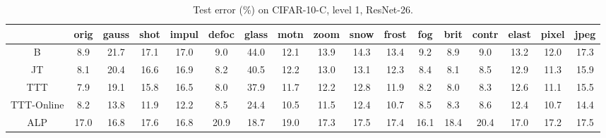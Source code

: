 \begin{table}[ht]
	\footnotesize
	\begin{center}
		{
			\setlength\tabcolsep{3.5pt}
			\begin{tabular}{c|c|c|c|c|c|c|c|c|c|c|c|c|c|c|c|c}
				\hline
				& orig& gauss& shot& impul& defoc& glass& motn& zoom& snow& frost& fog& brit& contr& elast& pixel& jpeg\\
				\hline
				B & 8.9& 21.7& 17.1& 17.0& 9.0& 44.0& 12.1& 13.9& 14.3& 13.4& 9.2& 8.9& 9.0& 13.2& 12.0& 17.3\\
				\hline
				JT & 8.1& 20.4& 16.6& 16.9& 8.2& 40.5& 12.2& 13.0& 13.1& 12.3& 8.4& 8.1& 8.5& 12.9& 11.3& 15.9\\
				\hline
				TTT & 7.9& 19.1& 15.8& 16.5& 8.0& 37.9& 11.7& 12.2& 12.8& 11.9& 8.2& 8.0& 8.3& 12.6& 11.1& 15.5\\
				\hline
				TTT-Online & 8.2& 13.8& 11.9& 12.2& 8.5& 24.4& 10.5& 11.5& 12.4& 10.7& 8.5& 8.3& 8.6& 12.4& 10.7& 14.4\\
				\hline
				ALP & 17.0& 16.8& 17.6& 16.8& 20.9& 18.7& 19.0& 17.3& 17.5& 17.4& 16.1& 18.4& 20.4& 17.0& 17.2 & 17.5\\
				\hline
			\end{tabular}
		}
	\end{center}
	\vspace{-2ex}
	\caption{
		Test error (\%) on CIFAR-10-C, level 1, ResNet-26.
	} 
\end{table} 